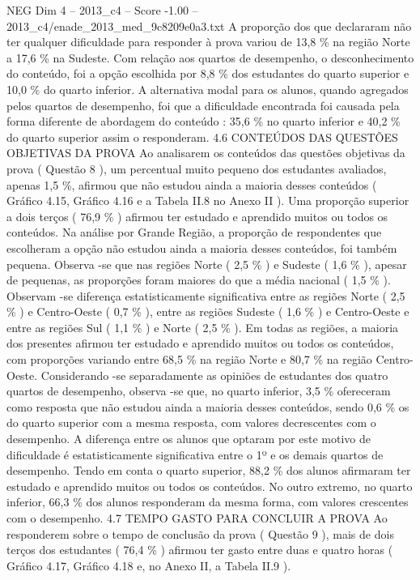 \begin{textsample}{NEG Dim 4 – 2013\_c4 – Score -1.00 – 2013\_c4/enade\_2013\_med\_9c8209e0a3.txt}
A proporção dos que declararam não ter qualquer dificuldade para responder à prova variou de 13,8 \% na região Norte a 17,6 \% na Sudeste.
Com relação aos quartos de desempenho, o desconhecimento do conteúdo, foi a opção escolhida por 8,8 \% dos estudantes do quarto superior e 10,0 \% do quarto inferior.
A alternativa modal para os alunos, quando agregados pelos quartos de desempenho, foi que a dificuldade encontrada foi causada pela forma diferente de abordagem do conteúdo : 35,6 \% no quarto inferior e 40,2 \% do quarto superior assim o responderam. 4.6 CONTEÚDOS DAS QUESTÕES OBJETIVAS DA PROVA Ao analisarem os conteúdos das questões objetivas da prova ( Questão 8 ), um percentual muito pequeno dos estudantes avaliados, apenas 1,5 \%, afirmou que não estudou ainda a maioria desses conteúdos ( Gráfico 4.15, Gráfico 4.16 e a Tabela II.8 no Anexo II ).
Uma proporção superior a dois terços ( 76,9 \% ) afirmou ter estudado e aprendido muitos ou todos os conteúdos.
Na análise por Grande Região, a proporção de respondentes que escolheram a opção não estudou ainda a maioria desses conteúdos, foi também pequena.
Observa -se que nas regiões Norte ( 2,5 \% ) e Sudeste ( 1,6 \% ), apesar de pequenas, as proporções foram maiores do que a média nacional ( 1,5 \% ).
Observam -se diferença estatisticamente significativa entre as regiões Norte ( 2,5 \% ) e Centro-Oeste ( 0,7 \% ), entre as regiões Sudeste ( 1,6 \% ) e Centro-Oeste e entre as regiões Sul ( 1,1 \% ) e Norte ( 2,5 \% ).
Em todas as regiões, a maioria dos presentes afirmou ter estudado e aprendido muitos ou todos os conteúdos, com proporções variando entre 68,5 \% na região Norte e 80,7 \% na região Centro-Oeste.
Considerando -se separadamente as opiniões de estudantes dos quatro quartos de desempenho, observa -se que, no quarto inferior, 3,5 \% ofereceram como resposta que não estudou ainda a maioria desses conteúdos, sendo 0,6 \% os do quarto superior com a mesma resposta, com valores decrescentes com o desempenho.
A diferença entre os alunos que optaram por este motivo de dificuldade é estatisticamente significativa entre o 1º e os demais quartos de desempenho.
Tendo em conta o quarto superior, 88,2 \% dos alunos afirmaram ter estudado e aprendido muitos ou todos os conteúdos.
No outro extremo, no quarto inferior, 66,3 \% dos alunos responderam da mesma forma, com valores crescentes com o desempenho. 4.7 TEMPO GASTO PARA CONCLUIR A PROVA Ao responderem sobre o tempo de conclusão da prova ( Questão 9 ), mais de dois terços dos estudantes ( 76,4 \% ) afirmou ter gasto entre duas e quatro horas ( Gráfico 4.17, Gráfico 4.18 e, no Anexo II, a Tabela II.9 ).

\end{textsample}
